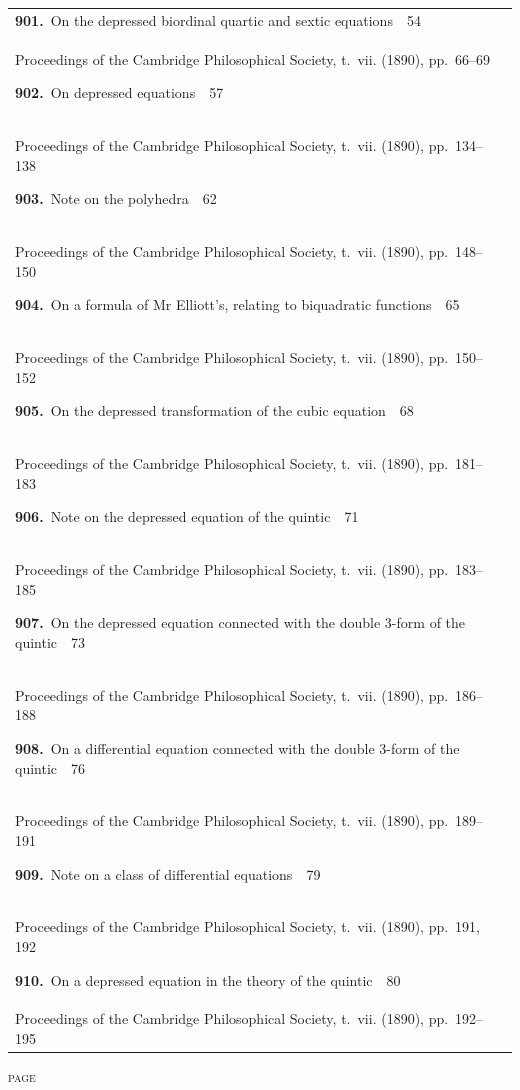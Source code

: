 \documentclass[11pt,a4paper]{book}
\newcommand{\paperentry}[4]{%
  \noindent\textbf{#1.}\ {#2}\ \dotfill\ {#3}\\[-0.2em]%
  {\small #4}\par\vspace{0.6em}%
}
\begin{document}
\begin{center}
\begin{tabular}{p{4.2in}r}
\paperentry{901}{On the depressed biordinal quartic and sextic equations}{54}{Proceedings of the Cambridge Philosophical Society, t.~vii. (1890), pp.~66--69}
\paperentry{902}{On depressed equations}{57}{Proceedings of the Cambridge Philosophical Society, t.~vii. (1890), pp.~134--138}
\paperentry{903}{Note on the polyhedra}{62}{Proceedings of the Cambridge Philosophical Society, t.~vii. (1890), pp.~148--150}
\paperentry{904}{On a formula of Mr Elliott's, relating to biquadratic functions}{65}{Proceedings of the Cambridge Philosophical Society, t.~vii. (1890), pp.~150--152}
\paperentry{905}{On the depressed transformation of the cubic equation}{68}{Proceedings of the Cambridge Philosophical Society, t.~vii. (1890), pp.~181--183}
\paperentry{906}{Note on the depressed equation of the quintic}{71}{Proceedings of the Cambridge Philosophical Society, t.~vii. (1890), pp.~183--185}
\paperentry{907}{On the depressed equation connected with the double 3-form of the quintic}{73}{Proceedings of the Cambridge Philosophical Society, t.~vii. (1890), pp.~186--188}
\paperentry{908}{On a differential equation connected with the double 3-form of the quintic}{76}{Proceedings of the Cambridge Philosophical Society, t.~vii. (1890), pp.~189--191}
\paperentry{909}{Note on a class of differential equations}{79}{Proceedings of the Cambridge Philosophical Society, t.~vii. (1890), pp.~191, 192}
\paperentry{910}{On a depressed equation in the theory of the quintic}{80}{Proceedings of the Cambridge Philosophical Society, t.~vii. (1890), pp.~192--195}
\end{tabular}
\end{center}

\newpage
\thispagestyle{fancy}
\begin{center}
{\small\textsc{page}}
\end{center}
\vspace{-0.5em}
\end{document}

